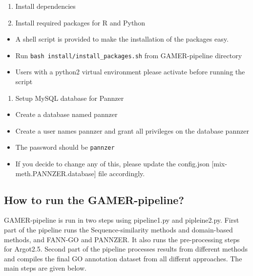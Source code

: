 \documentclass[11pt,letterpaper]{article}
\begin{document}
\begin{enumerate}
 \def\labelenumi{\arabic{enumi}.}

 \item
       Install dependencies
 \item
       Install required packages for R and Python
\end{enumerate}

\begin{itemize}

 \item
       A shell script is provided to make the installation of the packages
       easy.
 \item
       Run \texttt{bash\ install/install\_packages.sh} from GAMER-pipeline
       directory
 \item
       Users with a python2 virtual environment please activate before
       running the script
\end{itemize}

\begin{enumerate}
 \def\labelenumi{\arabic{enumi}.}
 \setcounter{enumi}{2}

 \item
       Setup MySQL database for Pannzer
\end{enumerate}

\begin{itemize}

 \item
       Create a database named pannzer
 \item
       Create a user names pannzer and grant all privileges on the database
       pannzer
 \item
       The password should be \texttt{pannzer}
 \item
       If you decide to change any of this, please update the config.json
       {[}mix-meth.PANNZER.database{]} file accordingly.
\end{itemize}

\subsection{How to run the
 GAMER-pipeline?}\label{how-to-run-the-gamer-pipeline}

GAMER-pipeline is run in two steps using pipeline1.py and pipleine2.py.
First part of the pipeline runs the Sequence-similarity methods and
domain-based methods, and FANN-GO and PANNZER. It also runs the
pre-processing steps for Argot2.5. Second part of the pipeline processes
results from different methods and compiles the final GO annotation
dataset from all differnt approaches. The main steps are given below.
\end{document}
